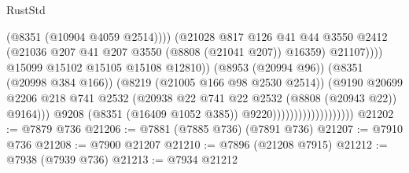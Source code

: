 \begin{lexlean}{RustStd}
\begin{coremodule}
                                                          (@8351 (@10904 @4059 @2514))))
                                                      (@21028
                                                        @817
                                                        @126
                                                        @41
                                                        @44
                                                        @3550
                                                        @2412
                                                        (@21036
                                                          @207
                                                          @41
                                                          @207
                                                          @3550
                                                          (@8808 (@21041 @207))
                                                          @16359)
                                                        @21107))))
                                                @15099
                                                @15102
                                                @15105
                                                @15108
                                                @12810))
                                            (@8953 (@20994 @96))
                                            (@8351 (@20998 @384 @166))
                                            (@8219 (@21005 @166 @98 @2530 @2514))
                                            (@9190
                                              @20699
                                              @2206
                                              @218
                                              @741
                                              @2532
                                              (@20938
                                                @22
                                                @741
                                                @22
                                                @2532
                                                (@8808 (@20943 @22))
                                                @9164)))
                                          @9208
                                          (@8351 (@16409 @1052 @385))
                                          @9220)))))))))))))))))))
@21202 := @7879 @736
@21206 := @7881 (@7885 @736) (@7891 @736)
@21207 := @7910 @736
@21208 := @7900 @21207
@21210 := @7896 (@21208 @7915)
@21212 := @7938 (@7939 @736)
@21213 := @7934 @21212

\end{coremodule}
\end{lexlean}

